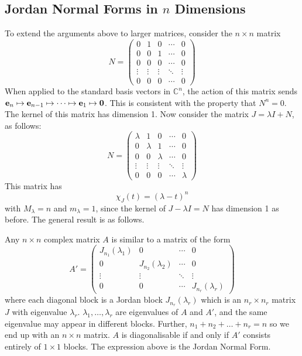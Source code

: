 \documentclass{article}
\begin{document}
\subsection{Jordan Normal Forms in $n$ Dimensions}
To extend the arguments above to larger matrices, consider the $n\times n$ matrix
\[ N = \begin{pmatrix}
        0      & 1      & 0      & \cdots & 0      \\
        0      & 0      & 1      & \cdots & 0      \\
        0      & 0      & 0      & \cdots & 0      \\
        \vdots & \vdots & \vdots & \ddots & \vdots \\
        0      & 0      & 0      & \cdots & 0
    \end{pmatrix} \]
When applied to the standard basis vectors in $\mathbb C^n$, the action of this matrix sends $\vb e_n \mapsto \vb e_{n-1} \mapsto \dots \mapsto \vb e_1 \mapsto \vb 0$. This is consistent with the property that $N^n = 0$. The kernel of this matrix has dimension 1. Now consider the matrix $J = \lambda I + N$, as follows:
\[ N = \begin{pmatrix}
        \lambda & 1       & 0       & \cdots & 0       \\
        0       & \lambda & 1       & \cdots & 0       \\
        0       & 0       & \lambda & \cdots & 0       \\
        \vdots  & \vdots  & \vdots  & \ddots & \vdots  \\
        0       & 0       & 0       & \cdots & \lambda
    \end{pmatrix} \]
This matrix has
\[ \chi_J(t) = (\lambda - t)^n \]
with $M_\lambda = n$ and $m_\lambda = 1$, since the kernel of $J - \lambda I = N$ has dimension 1 as before. The general result is as follows.
\begin{theorem}
    Any $n\times n$ complex matrix $A$ is similar to a matrix of the form
    \[ A' = \left( \begin{array}{c|c|c|c}
                J_{n_1}(\lambda_1) & 0                  & \cdots & 0                  \\\hline
                0                  & J_{n_2}(\lambda_2) & \cdots & 0                  \\\hline
                \vdots             & \vdots             & \ddots & \vdots             \\\hline
                0                  & 0                  & \cdots & J_{n_r}(\lambda_r)
            \end{array} \right) \]
    where each diagonal block is a Jordan block $J_{n_r}(\lambda_r)$ which is an $n_r \times n_r$ matrix $J$ with eigenvalue $\lambda_r$. $\lambda_1, \dots, \lambda_r$ are eigenvalues of $A$ and $A'$, and the same eigenvalue may appear in different blocks. Further, $n_1 + n_2 + \dots + n_r = n$ so we end up with an $n \times n$ matrix. $A$ is diagonalisable if and only if $A'$ consists entirely of $1 \times 1$ blocks. The expression above is the Jordan Normal Form.
\end{theorem}
\end{document}
